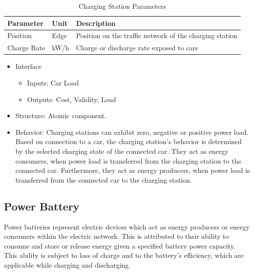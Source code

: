 \begin{table}[h]
	\renewcommand{\arraystretch}{1.3}
	\caption{Charging Station Parameters}
	\centering
	\begin{tabular}{lll}
		\hline
		\textbf{Parameter}       & \textbf{Unit} & \textbf{Description} \\ \hline
		Position      			 & Edge    	     & Position on the traffic network of the charging station \\  
		Charge Rate         	 & kW/h    		 & Charge or discharge rate exposed to cars     \\ \hline
	\end{tabular}
\end{table}

\begin{itemize}
	\item Interface
	\begin{itemize}
		\item Inputs: Car Load
		\item Outputs: Cost, Validity, Load
	\end{itemize}	
	\item Structure: Atomic component.
	\item Behavior: Charging stations can exhibit zero, negative or positive power load. Based on connection to a car, the charging station's behavior is determined by the selected charging state of the connected car. They act as energy consumers, when power load is transferred from the charging station to the connected car. Furthermore, they act as energy producers, when power load is transferred from the connected car to the charging station.
\end{itemize}

\subsection{Power Battery}
Power batteries represent electric devices which act as energy producers or energy consumers within the electric network.
This is attributed to their ability to consume and store or release energy given a specified battery power capacity. This ability is subject to loss of charge and to the battery's efficiency, which are applicable while charging and discharging. 

